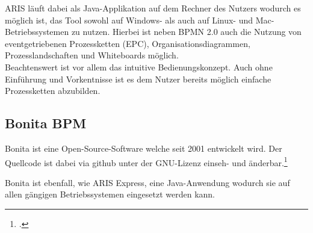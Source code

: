 ARIS läuft dabei als Java-Applikation
auf dem Rechner des Nutzers wodurch es möglich ist, das Tool sowohl auf Windows-
als auch auf Linux- und Mac-Betriebssystemen zu nutzen.
Hierbei ist neben BPMN 2.0 auch die Nutzung von eventgetriebenen
Prozessketten (EPC), Organisationsdiagrammen, 
Prozesslandschaften und Whiteboards möglich.\\

Beachtenswert ist vor allem das intuitive Bedienungskonzept.
Auch ohne Einführung und Vorkentnisse ist es dem Nutzer bereits möglich einfache
Prozessketten abzubilden.


\subsection{Bonita BPM}

Bonita ist eine Open-Source-Software welche seit 2001 entwickelt wird. Der
Quellcode ist dabei via github unter der GNU-Lizenz einseh- und
änderbar.\footcite{bonitasource}

\begin{figure}[H]
\begin{minipage}{\linewidth}
\begin{center}
\end{center}
\end{minipage}
\end{figure}

Bonita ist ebenfall, wie ARIS Express, eine Java-Anwendung wodurch sie auf allen
gängigen Betriebssystemen eingesetzt werden kann.

